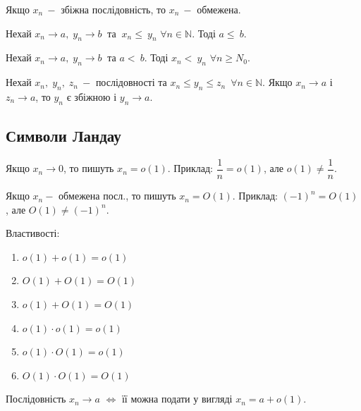 \begin{theorem}
        Якщо $x_n \: -$ збіжна послідовність, то $x_n \: -$ обмежена.  
\end{theorem}

\begin{theorem}
        Нехай $x_n \to a, \; y_n \to b\:$  та  $\:x_n \leqslant  \: y_n$  $\forall n \in \mathbb{N}$. Тоді $a\leqslant \:b$.
\end{theorem}

\begin{theorem}
        Нехай $x_n \to a, \; y_n \to b\:$  та
        $a < \: b$. Тоді  $x_n <  \: y_n$  $\forall n \geqslant N_0$.  
\end{theorem}

\begin{theorem}
        Нехай $x_n,\; y_n,\; z_n \: -$ послідовності та $x_n \leqslant  y_n \leqslant  z_n \;\: \forall n \in \mathbb{N}$. \newline Якщо $x_n \to a$ і $z_n \to a$, то $y_n$ є збіжною і $y_n \to a$.
\end{theorem}
\subsection{\large{Символи Ландау}}
\begin{definition} 
       Якщо $x_n \to 0$, то пишуть $x_n = o(1)$. Приклад: $\dfrac{1}{n} = o(1)$, але  $o(1) \neq \dfrac{1}{n}$.
       \end{definition}
 \begin{definition}       
       Якщо $x_n -$ обмежена посл., то пишуть $x_n = O(1)$. Приклад: $(-1)^{n} = O(1)$, але $O(1) \neq (-1)^{n}$.
       \end{definition}
       Властивості:
       \begin{enumerate}
           \item $o(1) + o(1) = o(1)$
           \item $O(1) + O(1) = O(1)$
           \item $o(1) + O(1) = O(1)$
           \item $o(1) \cdot o(1) = o(1)$
           \item $o(1) \cdot O(1) = o(1)$
           \item $O(1) \cdot O(1) = O(1)$
       \end{enumerate}


\begin{theorem}
        Послідовність $x_n \to a$ $\iff$ її можна подати у вигляді $x_n = a + o(1)$.
\end{theorem}

